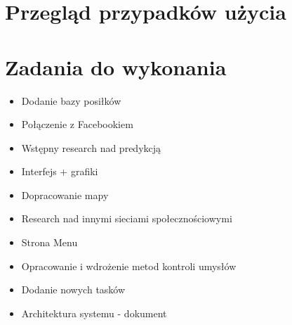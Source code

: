 \documentclass[a4paper,twoside,11pt]{article}
\begin{document}
\section{Przegląd przypadków użycia}

\section{Zadania do wykonania}
\begin{itemize}
  \item Dodanie bazy posiłków
  \item Połączenie z Facebookiem
  \item Wstępny research nad predykcją
  \item Interfejs + grafiki
  \item Dopracowanie mapy
  \item Research nad innymi sieciami społecznościowymi
  \item Strona Menu
  \item Opracowanie i wdrożenie metod kontroli umysłów
  \item Dodanie nowych tasków
  \item Architektura systemu - dokument
\end{itemize}
\end{document}

